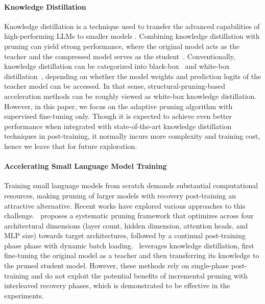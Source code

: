 \paragraph{Knowledge Distillation} Knowledge distillation is a technique used to transfer the advanced capabilities of high-performing LLMs to smaller models \citep{xu2024surveyknowledgedistillationlarge}. Combining knowledge distillation with pruning can yield strong performance, where the original model acts as the teacher and the compressed model serves as the student~\citep{sreenivas2024llmpruningdistillationpractice}.
Conventionally, knowledge distillation can be categorized into black-box~\citep{ho2022large,hsieh2023distilling} and white-box distillation~\citep{gu2023knowledge,latif2023knowledge,agarwal2023gkd,zhou2023distillspec,shum2024first}, depending on whether the model weights and prediction logits of the teacher model can be accessed. In that sense, structural-pruning-based acceleration methods can be roughly viewed as white-box knowledge distillation. However,
in this paper, we focus on the adaptive pruning algorithm with supervised fine-tuning only. Though it is expected to achieve even better performance when integrated with state-of-the-art knowledge distillation techniques in post-training, it normally incurs more complexity and training cost, hence we leave that for future exploration.

 \paragraph{Accelerating Small Language Model Training} Training small language models from scratch demands substantial computational resources, making pruning of larger models with recovery post-training an attractive alternative. Recent works have explored various approaches to this challenge.~\citet{xia2024shearedllamaacceleratinglanguage} proposes a systematic pruning framework that optimizes across four architectural dimensions (layer count, hidden dimension, attention heads, and MLP size) towards target architectures, followed by a continual post-training phase phase with dynamic batch loading.~\citet{sreenivas2024llmpruningdistillationpractice} leverages knowledge distillation, first fine-tuning the original model as a teacher and then transferring its knowledge to the pruned student model. However, these methods rely on single-phase post-training and do not exploit the potential benefits of incremental pruning with interleaved recovery phases, which is demonstrated to be effective in the experiments.